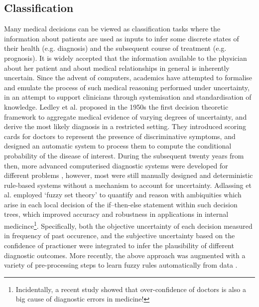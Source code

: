 \subsection{Classification} 
Many medical decisions can be viewed as classification tasks where the information about patients are used as inputs to infer some discrete states of their health (e.g. diagnosis) and the subsequent course of treatment (e.g. prognosis). It is widely accepted that the information available to the physician about her patient and about medical relationships in general is inherently uncertain. Since the advent of computers, academics have attempted to formalise and emulate the process of such medical reasoning performed under uncertainty,  in an attempt to support clinicians through systemisation and standardisation of knowledge. Ledley et al. \cite{ledley1959reasoning} proposed in the 1950s the first decision theoretic framework to aggregate medical evidence of varying degrees of uncertainty, and derive the most likely diagnosis in a restricted setting. They introduced scoring cards for doctors to represent the presence of discriminative symptoms, and designed an automatic system to process them to compute the conditional probability of the disease of interest. During the subsequent twenty years from then, more advanced computerised diagnostic systems were developed for different problems \cite{shortliffe1979knowledge,kulikowski1980artificial,duda1983expert}, however, most were still manually designed and deterministic rule-based systems without a mechanism to account for uncertainty. Adlassing et al. \cite{adlassnig1985cadiag,adlassnig1986fuzzy} employed `fuzzy set theory' to quantify and reason with ambiquities which arise in each local decision of the if–then-else statement within such decision trees, which improved accuracy and robustness in applications in internal medicince\footnote{Incidentally, a recent study \cite{berner2008overconfidence} showed that over-confidence of doctors is also a big cause of diagnostic errors in medicine!}. Specifically, both the objective uncertainty of each decision measured in frequency of past occurence, and the subjective uncertainty based on the confidence of practioner were integrated to infer the plausibility of different diagnostic outcomes. More recently, the above approach was augmented with a variety of pre-processing steps to learn fuzzy rules automatically from data \cite{steimann1998fuzzy,john2005modeling,straszecka2006combining,anooj2012clinical,tsipouras2008automated}. 

